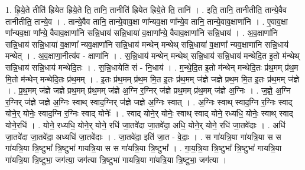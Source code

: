\documentclass[17pt]{extarticle}
\begin{document}
1. ह्रि॒ये॒ते तीति॑ ह्रियेत ह्रिये॒ते ति॒ तानि॒ तानीति॑ ह्रियेत ह्रिये॒ते ति॒ तानि॑ । . इति॒ तानि॒ तानीतीति॒ तान्ये॒वैव तानीतीति॒ तान्ये॒व । . तान्ये॒वैव तानि॒ तान्ये॒वाव॒क्षा णा᳚न्यव॒क्षा णा᳚न्ये॒व तानि॒ तान्ये॒वाव॒क्षाणा॑नि । . ए॒वाव॒क्षा णा᳚न्यव॒क्षा णा᳚न्ये॒ वैवाव॒क्षाणा॑नि सन्नि॒धाय॑ सन्नि॒धाया॑ व॒क्षाणा᳚न्ये॒ वैवाव॒क्षाणा॑नि सन्नि॒धाय॑ । . अ॒व॒क्षाणा॑नि सन्नि॒धाय॑ सन्नि॒धाया॑ व॒क्षाणा᳚ न्यव॒क्षाणा॑नि सन्नि॒धाय॑ मन्थेन् मन्थेथ् सन्नि॒धाया॑ व॒क्षाणा᳚ न्यव॒क्षाणा॑नि सन्नि॒धाय॑ मन्थेत् । . अ॒व॒क्षाणा॒नीत्य॑व - क्षाणा॑नि । . स॒न्नि॒धाय॑ मन्थेन् मन्थेथ् सन्नि॒धाय॑ सन्नि॒धाय॑ मन्थेदि॒त इ॒तो म॑न्थेथ् सन्नि॒धाय॑ सन्नि॒धाय॑ मन्थेदि॒तः । . स॒न्नि॒धायेति॑ सं - नि॒धाय॑ । . म॒न्थे॒दि॒त इ॒तो म॑न्थेन् मन्थेदि॒तः प्र॑थ॒मम् प्र॑थ॒म मि॒तो म॑न्थेन् मन्थेदि॒तः प्र॑थ॒मम् । . इ॒तः प्र॑थ॒मम् प्र॑थ॒म मि॒त इ॒तः प्र॑थ॒मम् ज॑ज्ञे जज्ञे प्रथ॒म मि॒त इ॒तः प्र॑थ॒मम् ज॑ज्ञे । . प्र॒थ॒मम् ज॑ज्ञे जज्ञे प्रथ॒मम् प्र॑थ॒मम् ज॑ज्ञे अ॒ग्नि र॒ग्निर् ज॑ज्ञे प्रथ॒मम् प्र॑थ॒मम् ज॑ज्ञे अ॒ग्निः । . ज॒ज्ञे॒ अ॒ग्नि र॒ग्निर् ज॑ज्ञे जज्ञे अ॒ग्निः स्वाथ् स्वाद॒ग्निर् ज॑ज्ञे जज्ञे अ॒ग्निः स्वात् । . अ॒ग्निः स्वाथ् स्वाद॒ग्नि र॒ग्निः स्वाद् योने॒र् योनेः॒ स्वाद॒ग्नि र॒ग्निः स्वाद् योनेः᳚ । . स्वाद् योने॒र् योनेः॒ स्वाथ् स्वाद् योने॒ रध्यधि॒ योनेः॒ स्वाथ् स्वाद् योने॒रधि॑ । . योने॒ रध्यधि॒ योने॒र् योने॒ रधि॑ जा॒तवे॑दा जा॒तवे॑दा॒ अधि॒ योने॒र् योने॒ रधि॑ जा॒तवे॑दाः । . अधि॑ जा॒तवे॑दा जा॒तवे॑दा॒ अध्यधि॑ जा॒तवे॑दाः । . जा॒तवे॑दा॒ इति॑ जा॒त - वे॒दाः॒ । . स गा॑यत्रि॒या गा॑यत्रि॒या स स गा॑यत्रि॒या त्रि॒ष्टुभा᳚ त्रि॒ष्टुभा॑ गायत्रि॒या स स गा॑यत्रि॒या त्रि॒ष्टुभा᳚ । . गा॒य॒त्रि॒या त्रि॒ष्टुभा᳚ त्रि॒ष्टुभा॑ गायत्रि॒या गा॑यत्रि॒या त्रि॒ष्टुभा॒ जग॑त्या॒ जग॑त्या त्रि॒ष्टुभा॑ गायत्रि॒या गा॑यत्रि॒या त्रि॒ष्टुभा॒ जग॑त्या । \newline
\end{document}

